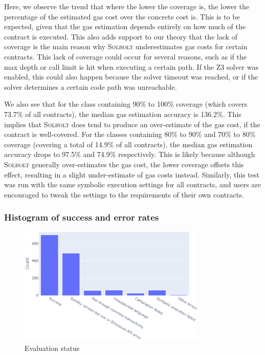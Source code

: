 Here, we observe the trend that where the lower the coverage is, 
the lower the percentage of the estimated gas cost over the concrete cost is.
This is to be expected, given that the gas estimation depends entirely on
how much of the contract is executed. This also adds support to our theory that
the lack of coverage is the main reason why \textcolor{NavyBlue}{\textsc{Solbolt}} underestimates gas costs for
certain contracts. This lack of coverage could occur for several reasons, such as
if the max depth or call limit is hit when executing a certain path. If the Z3 solver
was enabled, this could also happen because the solver timeout was reached, or if
the solver determines a certain code path was unreachable.

We also see that for the class
containing 90\% to 100\% coverage (which covers 73.7\% of all contracts),
the median gas estimation accuracy is 136.2\%. This implies that \textcolor{NavyBlue}{\textsc{Solbolt}} does tend to produce an
over-estimate of the gas cost, if the contract is well-covered. For the classes containing
80\% to 90\% and 70\% to 80\% coverage (covering a total of 14.9\% of all contracts),
the median gas estimation accuracy drops to 97.5\% and 74.9\% respectively. This is likely because
although \textcolor{NavyBlue}{\textsc{Solbolt}} generally over-estimates the gas cost, the lower coverage offsets this effect,
resulting in a slight under-estimate of gas costs instead. Similarly, this test was run with
the same symbolic execution settings for all contracts, and users are encouraged to tweak the
settings to the requirements of their own contracts.

\subsubsection{Histogram of success and error rates}

\begin{figure}[h]
  \centering
  \includegraphics[width=0.8\textwidth]{./figures/eval/eval_status}
  \caption{Evaluation status}
  \label{fig:eval_status}
\end{figure}

